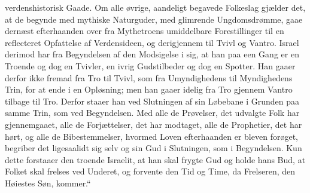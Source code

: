 \documentclass[12pt,a4paper]{book}
\begin{document}
verdenshistorisk Gaade. Om alle øvrige, aandeligt begavede Folkeslag gjælder
det, at de begynde med mythiske Naturguder, med glimrende Ungdomsdrømme, gaae
dernæst efterhaanden over fra Mythetroens umiddelbare Forestillinger til en
reflecteret Opfattelse af Verdensideen, og derigjennem til Tvivl og Vantro.
Israel derimod har fra Begyndelsen af den Modsigelse i sig, at han paa een Gang
er en Troende og dog en Tvivler, en ivrig Gudstilbeder og dog en Spotter. Han
gaaer derfor ikke fremad fra Tro til Tvivl, som fra Umyndighedens til
Myndighedens Trin, for at ende i en Opløsning; men han gaaer idelig fra Tro
gjennem Vantro tilbage til Tro. Derfor staaer han ved Slutningen af sin Løbebane
i Grunden paa samme Trin, som ved Begyndelsen. Med alle de Prøvelser, det
udvalgte Folk har gjennemgaaet, alle de Forjættelser, det har modtaget, alle de
Prophetier, det har hørt, og alle de Bibestemmelser, hvormed Loven efterhaanden
er bleven forøget, begriber det ligesaalidt sig selv og sin Gud i Slutningen,
som i Begyndelsen. Kun dette forstaaer den troende Israelit, at han skal frygte
Gud og holde hans Bud, at Folket skal frelses ved Underet, og forvente den Tid
og Time, da Frelseren, den Høiestes Søn, kommer.“
\end{document}
